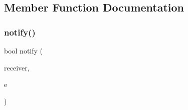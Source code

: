 \subsection{Member Function Documentation}
\mbox{\label{classQSPLApplication_a5552998f9e365b2cfd7b3eaf9d9a3de6}} 
\subsubsection{\texorpdfstring{notify()}{notify()}}
{\footnotesize\ttfamily bool notify (\begin{DoxyParamCaption}\item[{Q\+Object $\ast$}]{receiver,  }\item[{Q\+Event $\ast$}]{e }\end{DoxyParamCaption})}

